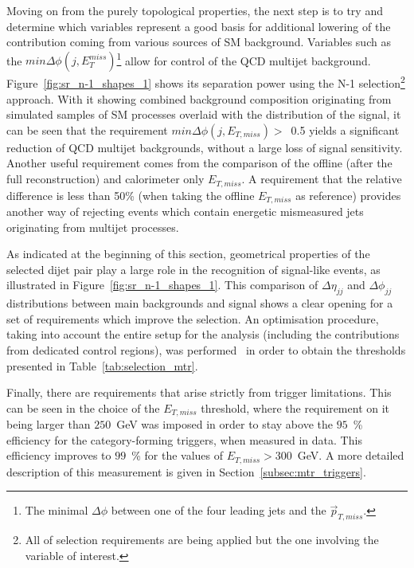 \hspace{10pt} Moving on from the purely topological properties, the next step is to try and determine which variables represent a good basis for additional lowering of the contribution coming from various sources of SM background. Variables such as the $min \Delta \phi (j, E_T^{miss})$\footnote{The minimal $\Delta\phi$ between one of the four leading jets and the $\vec{p}_{T, miss}$.} allow for control of the QCD multijet background. Figure~\ref{fig:sr_n-1_shapes_1} shows its separation power using the N-1 selection\footnote{All of selection requirements are being applied but the one involving the variable of interest.} approach. With it showing combined background composition originating from simulated samples of SM processes overlaid with the distribution of the signal, it can be seen that the requirement $min \Delta \phi (j, E_{T,miss})>$~0.5 yields a significant reduction of QCD multijet backgrounds, without a large loss of signal sensitivity. Another useful requirement comes from the comparison of the offline (after the full reconstruction) and calorimeter only $E_{T,miss}$. A requirement that the relative difference is less than 50\% (when taking the offline $E_{T,miss}$ as reference) provides another way of rejecting events which contain energetic mismeasured jets originating from multijet processes. 

\hspace{10pt} As indicated at the beginning of this section, geometrical properties of the selected dijet pair play a large role in the recognition of signal-like events, as illustrated in Figure~\ref{fig:sr_n-1_shapes_1}. This comparison of $\Delta \eta_{jj}$ and $\Delta \phi_{jj}$ distributions between main backgrounds and signal shows a clear opening for a set of requirements which improve the selection. An optimisation procedure, taking into account the entire setup for the analysis (including the contributions from dedicated control regions), was performed~\cite{paper:HIG_17_023} in order to obtain the thresholds presented in Table~\ref{tab:selection_mtr}. 

\hspace{10pt} Finally, there are requirements that arise strictly from trigger limitations. This can be seen in the choice of the $E_{T,miss}$ threshold, where the requirement on it being larger than $250$~GeV was imposed in order to stay above the $95$~\% efficiency for the category-forming triggers, when measured in data. This efficiency improves to $99$~\% for the values of $E_{T,miss}>300$~GeV. A more detailed description of this measurement is given in Section~\ref{subsec:mtr_triggers}.

